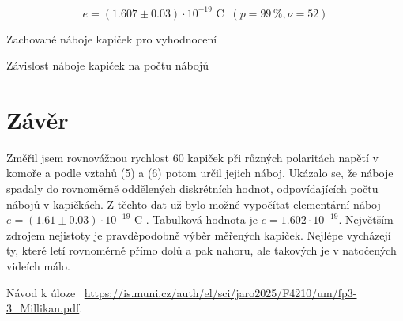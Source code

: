 \documentclass[a4paper,11pt]{article}
\begin{document}
\begin{equation}
e = (1.607 \pm 0.03) \cdot 10^{-19} \text{ C } \ (p= 99\,\%, \nu= 52)
\end{equation}

\begin{table}[htpb]
    \captionsetup{type=graph}
    \begin{minipage}{.45\linewidth}
        \centering
         
        \caption{Zachované náboje kapiček pro vyhodnocení}
    \end{minipage} 
    \hfill
    \begin{minipage}{.43\linewidth}
        \centering
        \resizebox{\textwidth}{!}{  }
        \caption{Závislost náboje kapiček na počtu nábojů}
    \end{minipage} 
\end{table}

\section{Závěr}

Změřil jsem rovnovážnou rychlost 60 kapiček při různých polaritách napětí v komoře a podle vztahů (5) a (6) potom určil jejich náboj. Ukázalo se, že náboje spadaly do rovnoměrně oddělených diskrétních hodnot, odpovídajících počtu nábojů v kapičkách. Z těchto dat už bylo možné vypočítat elementární náboj $ e = (1.61 \pm 0.03) \cdot 10^{-19} \text{ C } $. Tabulková hodnota je $ e = 1.602 \cdot 10 ^{-19} $. Největším zdrojem nejistoty je pravděpodobně výběr měřených kapiček. Nejlépe vycházejí ty, které letí rovnoměrně přímo dolů a pak nahoru, ale takových je v natočených videích málo. 

\begin{thebibliography}{0}
 Návod k úloze ~\url{https://is.muni.cz/auth/el/sci/jaro2025/F4210/um/fp3-3_Millikan.pdf}.   
\end{thebibliography}
\end{document}
